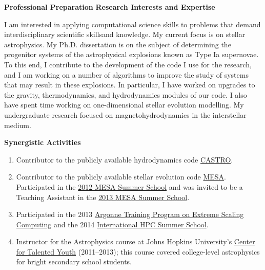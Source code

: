 \documentclass[11pt,letterpaper,english]{article}
\begin{document}
\begin{flushleft} {\bf Professional Preparation}
\vspace{-6pt}
{\bf Research Interests and Expertise}
{\parindent 16pt

I am interested in applying computational science skills to problems that demand interdisciplinary scientific skillsand knowledge. My current focus is on stellar astrophysics. My Ph.D. dissertation is on the subject of determining the progenitor systems of the astrophysical explosions known as Type Ia supernovae. To this end, I contribute to the development of the code I use for the research, and I am working on a number of algorithms to improve the study of systems that may result in these explosions. In particular, I have worked on upgrades to the gravity, thermodynamics, and hydrodynamics modules of our code. I also have spent time working on one-dimensional stellar evolution modelling. My undergraduate research focused on magnetohydrodynamics in the interstellar medium.
}


\vspace{.04in}
{\bf Synergistic Activities}
\vspace{-6pt}
\begin{enumerate} \itemsep1pt \parskip0pt 
\item Contributor to the publicly available hydrodynamics code \href{https://ccse.lbl.gov/Downloads/downloadCASTRO.html}{CASTRO}. \\ 
\item Contributor to the publicly available stellar evolution code \href{http://mesa.sourceforge.net/}{MESA}. Participated in the \href{http://cococubed.asu.edu/mesa_school_website/mesa_summer_school/Home.html}{2012 MESA Summer School} and was invited to be a Teaching Assistant in the \href{http://cococubed.asu.edu/mesa_summer_school_2013/Home.html}{2013 MESA Summer School}. \\ 
\item Participated in the 2013 \href{http://extremecomputingtraining.anl.gov/}{Argonne Training Program on Extreme Scaling Computing} and the 2014 \href{http://summerschool.niif.hu/}{International HPC Summer School}. \\
\item Instructor for the Astrophysics course at Johns Hopkins University's \href{http://cty.jhu.edu/}{Center for Talented Youth} (2011--2013); this course covered college-level astrophysics for bright secondary school students. \\ 
\end{enumerate} 


\end{flushleft}
\end{document}
